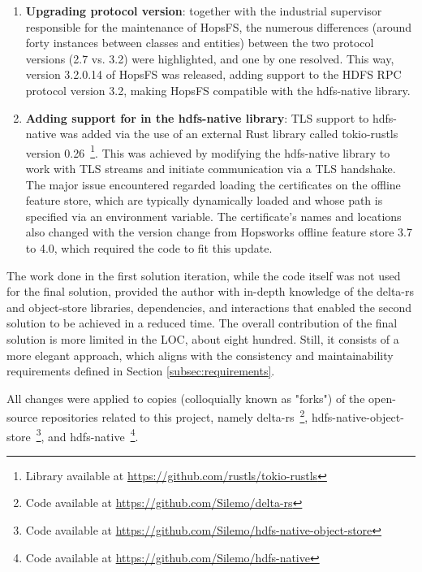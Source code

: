 \begin{enumerate}
  \item \textbf{Upgrading  protocol version}: together with the industrial supervisor responsible for the maintenance of \gls{HopsFS}, the numerous differences (around forty instances between classes and entities) between the two protocol versions (2.7 vs. 3.2) were highlighted, and one by one resolved. This way, version 3.2.0.14 of \gls{HopsFS} was released, adding support to the \gls{HDFS} \gls{RPC} protocol version 3.2, making \gls{HopsFS} compatible with the hdfs-native library.
  \item \textbf{Adding support for  in the hdfs-native library}: \gls{TLS} support to hdfs-native was added via the use of an external Rust library called tokio-rustls version 0.26~\footnote{Library available at \url{https://github.com/rustls/tokio-rustls}}. This was achieved by modifying the hdfs-native library to work with \gls{TLS} streams and initiate communication via a \gls{TLS} handshake. The major issue encountered regarded loading the certificates on the offline feature store, which are typically dynamically loaded and whose path is specified via an environment variable. The certificate's names and locations also changed with the version change from Hopsworks offline feature store 3.7 to 4.0, which required the code to fit this update.
\end{enumerate}

The work done in the first solution iteration, while the code itself was not used for the final solution, provided the author with in-depth knowledge of the delta-rs and object-store libraries, dependencies, and interactions that enabled the second solution to be achieved in a reduced time. The overall contribution of the final solution is more limited in the \gls{LOC}, about eight hundred. Still, it consists of a more elegant approach, which aligns with the consistency and maintainability requirements defined in Section \ref{subsec:requirements}.

All changes were applied to copies (colloquially known as "forks") of the open-source repositories related to this project, namely delta-rs~\footnote{Code available at \url{https://github.com/Silemo/delta-rs}}, hdfs-native-object-store~\footnote{Code available at \url{https://github.com/Silemo/hdfs-native-object-store}}, and hdfs-native~\footnote{Code available at \url{https://github.com/Silemo/hdfs-native}}.